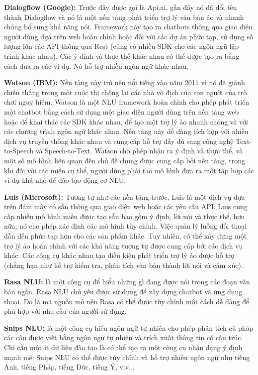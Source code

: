\textbf{Dialogflow (Google):} Trước đây được gọi là Api.ai, gần đây nó đã đổi tên thành Dialogflow và nó là một nền tảng phát triển trợ lý văn bản ảo và nhanh chóng bổ sung khả năng nói. Framework này tạo ra chatbots thông qua giao diện người dùng dựa trên web hoàn chỉnh hoặc đối với các dự án phức tạp, sử dụng số lượng lớn các API thông qua Rest (cũng có nhiều SDK cho các ngôn ngữ lập trình khác nhau). Các ý định và thực thể khác nhau có thể được tạo ra bằng cách đưa ra các ví dụ. Nó hỗ trợ nhiều ngôn ngữ khác nhau.

\textbf{Watson (IBM):} Nền tảng này trở nên nổi tiếng vào năm 2011 vì nó đã giành chiến thắng trong một cuộc thi chống lại các nhà vô địch của con người của trò chơi nguy hiểm. Watson là một NLU framework hoàn chỉnh cho phép phát triển một chatbot bằng cách sử dụng một giao diện người dùng trên nền tảng web hoặc để khai thác các SDK khác nhau, để tạo một trợ lý ảo nhanh chóng và với các chương trình ngôn ngữ khác nhau. Nền tảng này dễ dàng tích hợp với nhiều dịch vụ truyền thông khác nhau và cung cấp hỗ trợ đầy đủ sang công nghệ Text-to-Speech và Speech-to-Text. Watson cho phép nhận ra ý định và thực thể, và một số mô hình liên quan đến chủ đề chung được cung cấp bởi nền tảng, trong khi đối với các miền cụ thể, người dùng phải tạo mô hình đưa ra một tập hợp các ví dụ khá nhỏ để đào tạo động cơ NLU.

\textbf{Luis (Microsoft):} Tương tự như các nền tảng trước, Luis là một dịch vụ dựa trên đám mây có sẵn thông qua giao diện web hoặc các yêu cầu API. Luis cung cấp nhiều mô hình miền được tạo sẵn bao gồm ý định, lời nói và thực thể, hơn nữa, nó cho phép xác định các mô hình tùy chỉnh. Việc quản lý luồng đối thoại dẫn đến phức tạp hơn cho các sản phẩm khác. Tuy nhiên, có thể xây dựng một trợ lý ảo hoàn chỉnh với các khả năng tương tự được cung cấp bởi các dịch vụ khác. Các công cụ khác nhau tạo điều kiện phát triển trợ lý ảo được hỗ trợ (chẳng hạn như hỗ trợ kiểm tra, phân tích văn bản thành lời nói và cảm xúc).

\textbf{Rasa NLU:} là một công cụ để hiểu những gì đang được nói trong các đoạn văn bản ngắn. Rasa NLU chủ yếu được sử dụng để xây dựng chatbot và ứng dụng thoại. Do là mã nguồn mở nên Rasa có thể được tùy chỉnh một cách dễ dàng để phù hợp với nhu cầu của người sử dụng.

\textbf{Snips NLU:}  là một công cụ hiểu ngôn ngữ tự nhiên cho phép phân tích cú pháp các câu được viết bằng ngôn ngữ tự nhiên và trích xuất thông tin có cấu trúc. Chỉ cần một ít dữ liệu đào tạo là có thể tạo ra một công cụ nhận dạng ý định mạnh mẽ. Snips NLU có thể được tùy chỉnh và hỗ trợ nhiều ngôn ngữ như tiếng Anh, tiếng Pháp, tiếng Đức, tiếng Ý, v.v...

